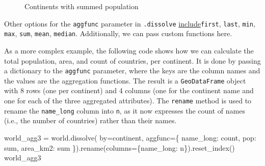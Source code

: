 \documentclass[
  letterpaper,
]{krantz}
\newenvironment{Shaded}{\begin{snugshade}}{\end{snugshade}}
\newcommand{\NormalTok}[1]{\textcolor[rgb]{0.00,0.23,0.31}{#1}}
\newcommand{\OperatorTok}[1]{\textcolor[rgb]{0.37,0.37,0.37}{#1}}
\newcommand{\StringTok}[1]{\textcolor[rgb]{0.13,0.47,0.30}{#1}}
\begin{document}
\begin{figure}[H]


\caption{\label{fig-spatial-aggregation}Continents with summed
population}

\end{figure}%

Other options for the \texttt{aggfunc} parameter in \texttt{.dissolve}
\href{https://geopandas.org/en/stable/docs/user_guide/aggregation_with_dissolve.html}{include}\texttt{\textquotesingle{}first\textquotesingle{}},
\texttt{\textquotesingle{}last\textquotesingle{}},
\texttt{\textquotesingle{}min\textquotesingle{}},
\texttt{\textquotesingle{}max\textquotesingle{}},
\texttt{\textquotesingle{}sum\textquotesingle{}},
\texttt{\textquotesingle{}mean\textquotesingle{}},
\texttt{\textquotesingle{}median\textquotesingle{}}. Additionally, we
can pass custom functions here.

As a more complex example, the following code shows how we can calculate
the total population, area, and count of countries, per continent. It is
done by passing a dictionary to the \texttt{aggfunc} parameter, where
the keys are the column names and the values are the aggregation
functions. The result is a \texttt{GeoDataFrame} object with 8 rows (one
per continent) and 4 columns (one for the continent name and one for
each of the three aggregated attributes). The \texttt{rename} method is
used to rename the
\texttt{\textquotesingle{}name\_long\textquotesingle{}} column into
\texttt{\textquotesingle{}n\textquotesingle{}}, as it now expresses the
count of names (i.e., the number of countries) rather than their names.

\begin{Shaded}
\begin{Highlighting}[]
\NormalTok{world\_agg3 }\OperatorTok{=}\NormalTok{ world.dissolve(}
\NormalTok{    by}\OperatorTok{=}\StringTok{\textquotesingle{}continent\textquotesingle{}}\NormalTok{, }
\NormalTok{    aggfunc}\OperatorTok{=}\NormalTok{\{}
        \StringTok{\textquotesingle{}name\_long\textquotesingle{}}\NormalTok{: }\StringTok{\textquotesingle{}count\textquotesingle{}}\NormalTok{,}
        \StringTok{\textquotesingle{}pop\textquotesingle{}}\NormalTok{: }\StringTok{\textquotesingle{}sum\textquotesingle{}}\NormalTok{,}
        \StringTok{\textquotesingle{}area\_km2\textquotesingle{}}\NormalTok{: }\StringTok{\textquotesingle{}sum\textquotesingle{}}
\NormalTok{    \}).rename(columns}\OperatorTok{=}\NormalTok{\{}\StringTok{\textquotesingle{}name\_long\textquotesingle{}}\NormalTok{: }\StringTok{\textquotesingle{}n\textquotesingle{}}\NormalTok{\}).reset\_index()}
\NormalTok{world\_agg3}
\end{Highlighting}
\end{Shaded}
\end{document}
